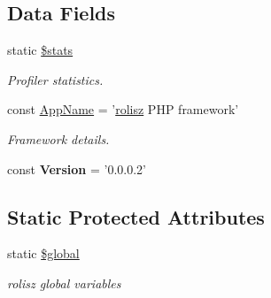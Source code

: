 \subsection*{Data Fields}
\begin{DoxyCompactItemize}
\item 
\hypertarget{classbase_ac61adefb58583938c9b820405ddfa018}{
static \hyperlink{classbase_ac61adefb58583938c9b820405ddfa018}{\$stats}}
\label{classbase_ac61adefb58583938c9b820405ddfa018}

\begin{DoxyCompactList}\small\item\em Profiler statistics. \item\end{DoxyCompactList}\end{DoxyCompactItemize}
{\bf }\par
\begin{DoxyCompactItemize}
\item 
\hypertarget{classbase_aab75444b144ffc4e972a9170e0a76ec0}{
const \hyperlink{classbase_aab75444b144ffc4e972a9170e0a76ec0}{AppName} = '\hyperlink{classrolisz}{rolisz} PHP framework'}
\label{classbase_aab75444b144ffc4e972a9170e0a76ec0}

\begin{DoxyCompactList}\small\item\em Framework details. \item\end{DoxyCompactList}\item 
\hypertarget{classbase_a62e44de9100d83ee01f5b4875b49a02b}{
const {\bfseries Version} = '0.0.0.2'}
\label{classbase_a62e44de9100d83ee01f5b4875b49a02b}

\end{DoxyCompactItemize}

\subsection*{Static Protected Attributes}
\begin{DoxyCompactItemize}
\item 
\hypertarget{classbase_aad844777d9d6beb4ca7c92d97afe7d27}{
static \hyperlink{classbase_aad844777d9d6beb4ca7c92d97afe7d27}{\$global}}
\label{classbase_aad844777d9d6beb4ca7c92d97afe7d27}

\begin{DoxyCompactList}\small\item\em rolisz global variables \item\end{DoxyCompactList}\end{DoxyCompactItemize}


